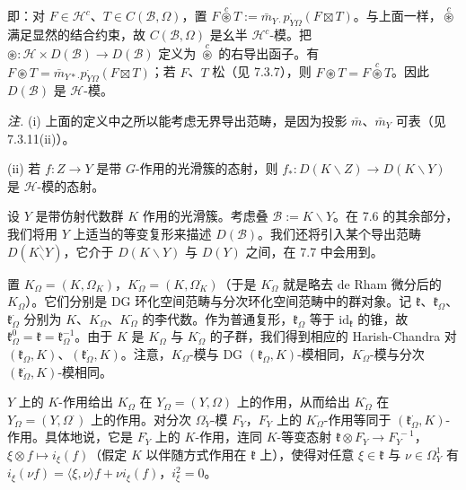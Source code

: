 即：对 $F\in\mathcal{H}^{c}$、$T\in C(\mathcal{B},\Omega)$，置 $F\overset{c}{\circledast}T:=\bar m_{Y\cdot}p^{\cdot}_{Y\Omega}(F\boxtimes T)$。与上面一样，$\overset{c}{\circledast}$ 满足显然的结合约束，故 $C(\mathcal{B},\Omega)$ 是幺半 $\mathcal{H}^{c}$-模。把 $\circledast:\mathcal{H}\times D(\mathcal{B})\longrightarrow D(\mathcal{B})$ 定义为 $\overset{c}{\circledast}$ 的右导出函子。有 $F\circledast T=\bar m_{Y*\cdot}p^{\cdot}_{Y\Omega}(F\boxtimes T)$；若 $F$、$T$ 松（见 7.3.7），则 $F\circledast T=F\overset{c}{\circledast}T$。因此 $D(\mathcal{B})$ 是 $\mathcal{H}$-模。

 \emph{注.} (i) 上面的定义中之所以能考虑无界导出范畴，是因为投影 $\bar m$、$\bar m_{Y}$ 可表（见 7.3.11(ii)）。

(ii) 若 $f:Z\to Y$ 是带 $G$-作用的光滑簇的态射，则 $f_{*}:D(K\backslash Z)\to D(K\backslash Y)$ 是 $\mathcal{H}$-模的态射。

 设 $Y$ 是带仿射代数群 $K$ 作用的光滑簇。考虑叠 $\mathcal{B}:=K\backslash Y$。在 7.6 的其余部分，我们将用 $Y$ 上适当的等变复形来描述 $D(\mathcal{B})$。我们还将引入某个导出范畴 $D(K^{\backslash}_{\backslash}Y)$，它介于 $D(K\backslash Y)$ 与 $D(Y)$ 之间，在 7.7 中会用到。


置 $K_{\Omega}=(K,\Omega_{K})$，$K^{\cdot}_{\Omega}=(K,\Omega^{\cdot}_{K})$（于是 $K^{\cdot}_{\Omega}$ 就是略去 de Rham 微分后的 $K_{\Omega}$）。它们分别是 DG 环化空间范畴与分次环化空间范畴中的群对象。记 $\mathfrak{k}$、$\mathfrak{k}_{\Omega}$、$\mathfrak{k}^{\cdot}_{\Omega}$ 分别为 $K$、$K_{\Omega}$、$K^{\cdot}_{\Omega}$ 的李代数。作为普通复形，$\mathfrak{k}_{\Omega}$ 等于 $\mathrm{id}_{\mathfrak{k}}$ 的锥，故 $\mathfrak{k}^{0}_{\Omega}=\mathfrak{k}=\mathfrak{k}^{-1}_{\Omega}$。由于 $K$ 是 $K_{\Omega}$ 与 $K^{\cdot}_{\Omega}$ 的子群，我们得到相应的 Harish-Chandra 对 $(\mathfrak{k}_{\Omega},K)$、$(\mathfrak{k}^{\cdot}_{\Omega},K)$。注意，$K_{\Omega}$-模与 DG $(\mathfrak{k}_{\Omega},K)$-模相同，$K^{\cdot}_{\Omega}$-模与分次 $(\mathfrak{k}^{\cdot}_{\Omega},K)$-模相同。


$Y$ 上的 $K$-作用给出 $K_{\Omega}$ 在 $Y_{\Omega}=(Y,\Omega)$ 上的作用，从而给出 $K^{\cdot}_{\Omega}$ 在 $Y^{\cdot}_{\Omega}=(Y,\Omega^{\cdot})$ 上的作用。对分次 $\Omega^{\cdot}_{Y}$-模 $F^{\cdot}_{Y}$，$F^{\cdot}_{Y}$ 上的 $K^{\cdot}_{\Omega}$-作用等同于 $(\mathfrak{k}^{\cdot}_{\Omega},K)$-作用。具体地说，它是 $F^{\cdot}_{Y}$ 上的 $K$-作用，连同 $K$-等变态射 $\mathfrak{k}\otimes F^{\cdot}_{Y}\to F^{\cdot-1}_{Y}$，$\xi\otimes f\mapsto i_{\xi}(f)$（假定 $K$ 以伴随方式作用在 $\mathfrak{k}$ 上），使得对任意 $\xi\in\mathfrak{k}$ 与 $\nu\in\Omega^{1}_{Y}$ 有 $i_{\xi}(\nu f)=\langle\xi,\nu\rangle f+\nu i_{\xi}(f)$，$i^{2}_{\xi}=0$。


